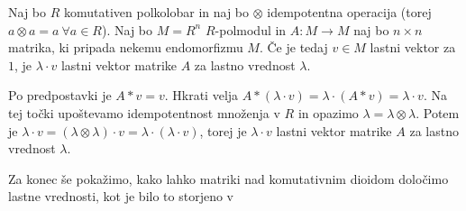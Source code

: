 \documentclass[mat1]{fmfdelo}
\newcommand{\map}[3]{\ensuremath{{#1}:{#2}\rightarrow{#3}}}
\begin{document}
\begin{trditev}
Naj bo $R$ komutativen polkolobar in naj bo $\otimes$ idempotentna operacija (torej $a\otimes a = a ~\forall a\in R$). Naj bo $M=R^n$ $R$-polmodul in $\map{A}{M}{M}$ naj bo $n\times n$ matrika, ki pripada nekemu endomorfizmu $M$. Če je tedaj $v\in M$ lastni vektor za $1$, je $\lambda\cdot v$ lastni vektor matrike $A$ za lastno vrednost $\lambda$.
\end{trditev}
\begin{dokaz}
	Po predpostavki je $A*v = v$. Hkrati velja $A*(\lambda\cdot v) = \lambda\cdot (A*v) = \lambda\cdot v$. Na tej točki upoštevamo idempotentnost množenja v $R$ in opazimo $\lambda = \lambda\otimes\lambda$. Potem je $\lambda\cdot v = (\lambda\otimes\lambda)\cdot v = \lambda \cdot (\lambda\cdot v)$, torej je $\lambda\cdot v$ lastni vektor matrike $A$ za lastno vrednost $\lambda$.
\end{dokaz}

Za konec še pokažimo, kako lahko matriki nad komutativnim dioidom določimo lastne vrednosti, kot je bilo to storjeno v \cite[poglajve 6, izrek 6]{bib:Gondran}
\end{document}
